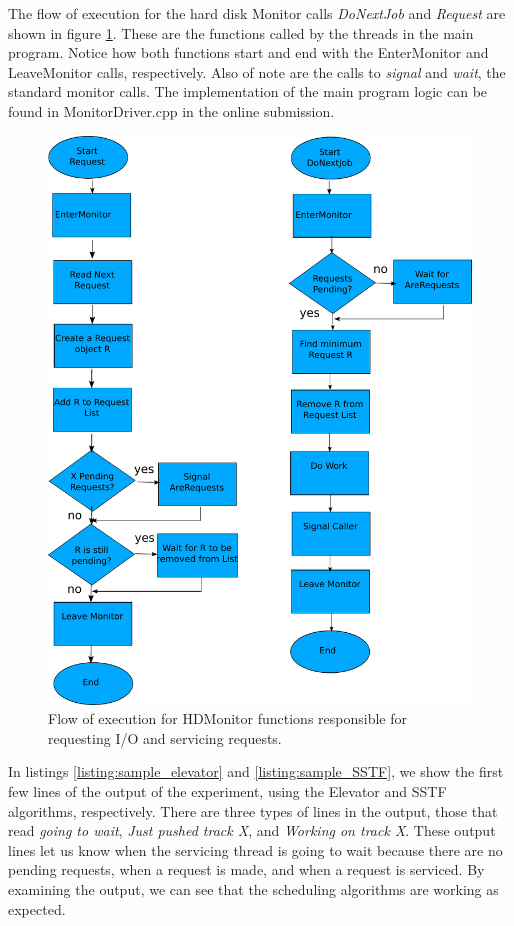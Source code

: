 \documentclass{report}
\begin{document}
The flow of execution for the hard disk Monitor calls \emph{DoNextJob} and \emph{Request}
are shown in figure \ref{fig:flow}. These are the functions called by the threads in the
main program. Notice how both functions start and end with the EnterMonitor and
LeaveMonitor calls, respectively. Also of note are the calls to \emph{signal} and
\emph{wait}, the standard monitor calls. The implementation of the main program logic can
be found in MonitorDriver.cpp in the online submission.
\begin{figure}[htb!]
    \centering
    \includegraphics[scale=0.8]{300_flow.pdf}
    \caption{Flow of execution for HDMonitor functions responsible for requesting I/O and
    servicing requests.}
    \label{fig:flow}
\end{figure}

In listings \ref{listing:sample_elevator} and \ref{listing:sample_SSTF}, we show the
first few lines of the output of the experiment, using the Elevator and SSTF algorithms,
respectively. There are three types of lines in the output, those that read \emph{going to
wait}, \emph{Just pushed track X}, and \emph{Working on track X}. These output lines let
us know when the servicing thread is going to wait because there are no pending requests,
when a request is made, and when a request is serviced. By examining the output, we can
see that the scheduling algorithms are working as expected. 
\end{document}
